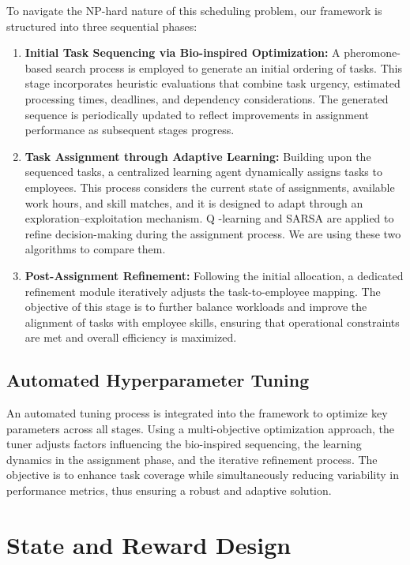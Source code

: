 \documentclass[%
aip,
cp,  %
amsmath,amssymb,
reprint,%
]{revtex4-2}
\begin{document}
	To navigate the NP-hard nature of this scheduling problem, our framework is structured
	into three sequential phases:
	
	\begin{enumerate}
		\item \textbf{Initial Task Sequencing via Bio-inspired Optimization:} A
		pheromone-based search process is employed to generate an initial ordering
		of tasks. This stage incorporates heuristic evaluations that combine task urgency,
		estimated processing times, deadlines, and dependency considerations. The generated
		sequence is periodically updated to reflect improvements in assignment performance
		as subsequent stages progress.
		
		\item \textbf{Task Assignment through Adaptive Learning:} Building upon the
		sequenced tasks, a centralized learning agent dynamically assigns tasks to
		employees. This process considers the current state of assignments, available
		work hours, and skill matches, and it is designed to adapt through an exploration–exploitation
		mechanism. Q -learning and SARSA are applied to refine
		decision-making during the assignment process. We are using these two algorithms to compare them.
		
		\item \textbf{Post-Assignment Refinement:} Following the initial allocation,
		a dedicated refinement module iteratively adjusts the task-to-employee mapping.
		The objective of this stage is to further balance workloads and improve
		the alignment of tasks with employee skills, ensuring that operational constraints
		are met and overall efficiency is maximized.
	\end{enumerate}
	
	\subsection{\label{subsec:tuning}Automated Hyperparameter Tuning}
	
	An automated tuning process is integrated into the framework to optimize key parameters
	across all stages. Using a multi-objective optimization approach, the tuner adjusts
	factors influencing the bio-inspired sequencing, the learning dynamics in the
	assignment phase, and the iterative refinement process. The objective is to
	enhance task coverage while simultaneously reducing variability in performance
	metrics, thus ensuring a robust and adaptive solution.
	
	\section{\label{sec:state}State and Reward Design}
	
\end{document}
